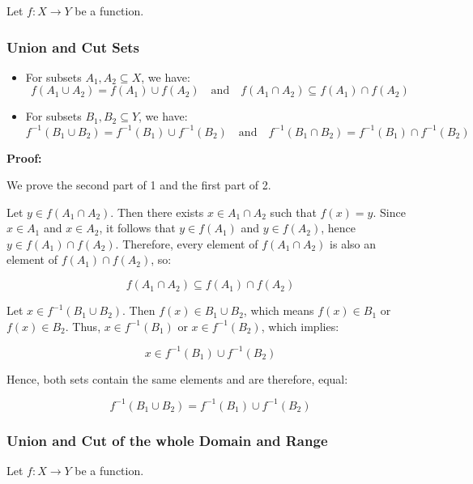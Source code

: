 Let \( f : X \to Y \) be a function.

\subsubsection{Union and Cut Sets}

\begin{itemize}
	\item For subsets \( A_1, A_2 \subseteq X \), we have:
	      \[
		      f(A_1 \cup A_2) = f(A_1) \cup f(A_2)
		      \quad \text{and} \quad
		      f(A_1 \cap A_2) \subseteq f(A_1) \cap f(A_2)
	      \]

	\item For subsets \( B_1, B_2 \subseteq Y \), we have:
	      \[
		      f^{-1}(B_1 \cup B_2) = f^{-1}(B_1) \cup f^{-1}(B_2)
		      \quad \text{and} \quad
		      f^{-1}(B_1 \cap B_2) = f^{-1}(B_1) \cap f^{-1}(B_2)
	      \]
\end{itemize}

\textbf{Proof:}

We prove the second part of 1 and the first part of 2.
\vspace{\baselineskip}

Let \( y \in f(A_1 \cap A_2) \). Then there exists \( x \in A_1 \cap A_2 \) such that 
\( f(x) = y \). Since \( x \in A_1 \) and \( x \in A_2 \), it follows that \( y \in f(A_1) \) 
and \( y \in f(A_2) \), hence \( y \in f(A_1) \cap f(A_2) \). Therefore, every element of \( f(A_1 \cap A_2) \) 
is also an element of \( f(A_1) \cap f(A_2) \), so:

\[
	f(A_1 \cap A_2) \subseteq f(A_1) \cap f(A_2)
 \]

Let \( x \in f^{-1} (B_1 \cup B_2) \). Then \( f(x) \in B_1 \cup B_2 \), which means \( f(x) \in B_1 \) 
or \( f(x) \in B_2 \). Thus, \( x \in f^{-1}(B_1) \) 
or \( x \in f^{-1}(B_2) \), which implies:
	      
\[
	 x \in f^{-1}(B_1) \cup f^{-1}(B_2)
\]

Hence, both sets contain the same elements and are therefore, equal:
	      
\[
	f^{-1}(B_1 \cup B_2) = f^{-1}(B_1) \cup f^{-1}(B_2)
\]

\QED

\subsubsection{Union and Cut of the whole Domain and Range}

Let \( f : X \to Y \) be a function.

